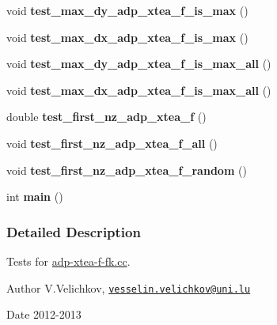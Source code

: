 \begin{DoxyCompactItemize}
\item 
\hypertarget{adp-xtea-f-fk-tests_8cc_a9b4d4dd2dcd3e853f63831dbed50fbe5}{void {\bfseries test\-\_\-max\-\_\-dy\-\_\-adp\-\_\-xtea\-\_\-f\-\_\-is\-\_\-max} ()}\label{adp-xtea-f-fk-tests_8cc_a9b4d4dd2dcd3e853f63831dbed50fbe5}

\item 
\hypertarget{adp-xtea-f-fk-tests_8cc_ae1130585af7445711f66f0a980ed2a72}{void {\bfseries test\-\_\-max\-\_\-dx\-\_\-adp\-\_\-xtea\-\_\-f\-\_\-is\-\_\-max} ()}\label{adp-xtea-f-fk-tests_8cc_ae1130585af7445711f66f0a980ed2a72}

\item 
\hypertarget{adp-xtea-f-fk-tests_8cc_a6f936878bc3621fba1067e2ccad60198}{void {\bfseries test\-\_\-max\-\_\-dy\-\_\-adp\-\_\-xtea\-\_\-f\-\_\-is\-\_\-max\-\_\-all} ()}\label{adp-xtea-f-fk-tests_8cc_a6f936878bc3621fba1067e2ccad60198}

\item 
\hypertarget{adp-xtea-f-fk-tests_8cc_a904489235a2cec714916af1e85cfabcb}{void {\bfseries test\-\_\-max\-\_\-dx\-\_\-adp\-\_\-xtea\-\_\-f\-\_\-is\-\_\-max\-\_\-all} ()}\label{adp-xtea-f-fk-tests_8cc_a904489235a2cec714916af1e85cfabcb}

\item 
\hypertarget{adp-xtea-f-fk-tests_8cc_a866f4c0c5c5543a3ff2bea0a3b4e5d57}{double {\bfseries test\-\_\-first\-\_\-nz\-\_\-adp\-\_\-xtea\-\_\-f} ()}\label{adp-xtea-f-fk-tests_8cc_a866f4c0c5c5543a3ff2bea0a3b4e5d57}

\item 
\hypertarget{adp-xtea-f-fk-tests_8cc_aa4c2675683d34fe6a9ee54ba3548ee0b}{void {\bfseries test\-\_\-first\-\_\-nz\-\_\-adp\-\_\-xtea\-\_\-f\-\_\-all} ()}\label{adp-xtea-f-fk-tests_8cc_aa4c2675683d34fe6a9ee54ba3548ee0b}

\item 
\hypertarget{adp-xtea-f-fk-tests_8cc_ae8e084f53c2897dd218d8ca5ed6371b8}{void {\bfseries test\-\_\-first\-\_\-nz\-\_\-adp\-\_\-xtea\-\_\-f\-\_\-random} ()}\label{adp-xtea-f-fk-tests_8cc_ae8e084f53c2897dd218d8ca5ed6371b8}

\item 
\hypertarget{adp-xtea-f-fk-tests_8cc_ae66f6b31b5ad750f1fe042a706a4e3d4}{int {\bfseries main} ()}\label{adp-xtea-f-fk-tests_8cc_ae66f6b31b5ad750f1fe042a706a4e3d4}

\end{DoxyCompactItemize}


\subsubsection{\-Detailed \-Description}
\-Tests for \hyperlink{adp-xtea-f-fk_8cc}{adp-\/xtea-\/f-\/fk.\-cc}. \begin{DoxyAuthor}{\-Author}
\-V.\-Velichkov, \href{mailto:vesselin.velichkov@uni.lu}{\tt vesselin.\-velichkov@uni.\-lu} 
\end{DoxyAuthor}
\begin{DoxyDate}{\-Date}
2012-\/2013 
\end{DoxyDate}
